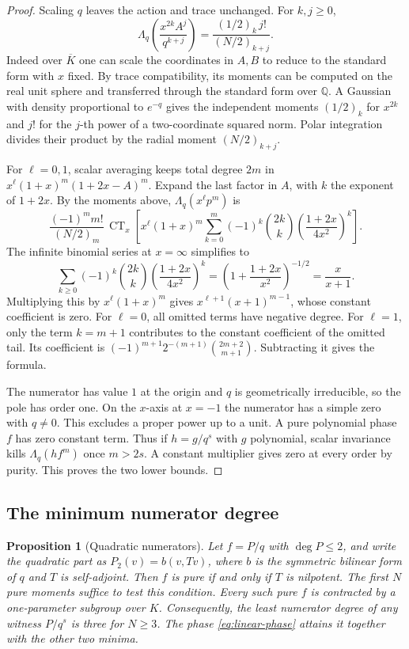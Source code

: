 \documentclass[11pt]{article}
\newtheorem{proposition}[theorem]{Proposition}
\newcommand{\CT}{\operatorname{CT}}
\newcommand{\Lq}{\Lambda_q}
\begin{document}
\begin{proof}
Scaling \(q\) leaves the action and trace unchanged. For \(k,j\ge0\),
\[
          \Lq\left(\frac{x^{2k}A^j}{q^{k+j}}\right)
              =\frac{(1/2)_k\,j!}{(N/2)_{k+j}}.
\]
Indeed over \(\overline K\) one can scale the coordinates in \(A,B\)
to reduce to the standard form with \(x\) fixed. By trace
compatibility, its moments can be computed on the real unit sphere
and transferred through the standard form over \(\mathbb Q\).
A Gaussian with density proportional to \(e^{-q}\) gives the
independent moments \((1/2)_k\) for \(x^{2k}\) and \(j!\) for
the \(j\)-th power of a two-coordinate squared norm.
Polar integration divides their product by the radial moment
\((N/2)_{k+j}\).

For \(\ell=0,1\), scalar averaging keeps total degree \(2m\) in
\(x^\ell(1+x)^m(1+2x-A)^m\). Expand the last factor in \(A\),
with \(k\) the exponent of \(1+2x\). By the moments above,
\(\Lq(x^\ell p^m)\) is
\[
 \frac{(-1)^m m!}{(N/2)_m}\,
 \CT_x\left[x^\ell(1+x)^m\sum_{k=0}^m(-1)^k\binom{2k}k
                         \left(\frac{1+2x}{4x^2}\right)^k\right].
\]
The infinite binomial series at \(x=\infty\) simplifies to
\[
 \sum_{k\ge0}(-1)^k\binom{2k}k\left(\frac{1+2x}{4x^2}\right)^k
     =\left(1+\frac{1+2x}{x^2}\right)^{-1/2}
     =\frac{x}{x+1}.
\]
Multiplying this by \(x^\ell(1+x)^m\) gives
\(x^{\ell+1}(x+1)^{m-1}\), whose constant coefficient is zero.
For \(\ell=0\), all omitted terms have negative degree.
For \(\ell=1\), only the term \(k=m+1\) contributes to the
constant coefficient of the omitted tail. Its coefficient is
\((-1)^{m+1}2^{-(m+1)}\binom{2m+2}{m+1}\). Subtracting it gives the formula.

The numerator has value \(1\) at the origin and \(q\) is
geometrically irreducible, so the pole has order one. On the
\(x\)-axis at \(x=-1\) the numerator has a simple zero with \(q\ne0\).
This excludes a proper power up to a unit.
A pure polynomial phase \(f\) has zero constant term. Thus if \(h=g/q^s\)
with \(g\) polynomial, scalar invariance kills \(\Lq(hf^m)\)
once \(m>2s\). A constant multiplier gives
zero at every order by purity. This proves the two lower bounds.
\end{proof}

\subsection*{The minimum numerator degree}

\begin{proposition}[Quadratic numerators]\label{prop:quadratic-numerator}
Let \(f=P/q\) with \(\deg P\le2\), and write the quadratic part as
\(P_2(v)=b(v,Tv)\), where \(b\) is the symmetric bilinear form of \(q\)
and \(T\) is self-adjoint. Then \(f\) is pure if and only if \(T\) is
nilpotent. The first \(N\) pure moments suffice to test this condition.
Every such pure \(f\) is contracted by a one-parameter subgroup over \(K\).
Consequently, the least numerator degree of any witness \(P/q^s\) is
three for \(N\ge3\). The phase \eqref{eq:linear-phase} attains it
together with the other two minima.
\end{proposition}
\end{document}
